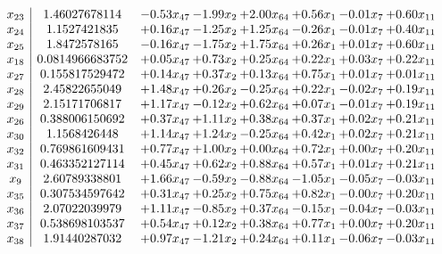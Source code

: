 \documentclass[8pt]{article}
\begin{document}
\[\begin{array}{c| c c@{\hskip 2pt} c@{\hskip 2pt} c@{\hskip 2pt} c@{\hskip 2pt} c@{\hskip 2pt} c@{\hskip 2pt} }
 x_{23}   &  1.46027678114 & -0.53 x_{47} & -1.99 x_{2} & +  2.00 x_{64} & +  0.56 x_{1} & -0.01 x_{7} & +  0.60 x_{11}\\
 x_{24}   &  1.1527421835 & +  0.16 x_{47} & -1.25 x_{2} & +  1.25 x_{64} & -0.26 x_{1} & -0.01 x_{7} & +  0.40 x_{11}\\
 x_{25}   &  1.8472578165 & -0.16 x_{47} & -1.75 x_{2} & +  1.75 x_{64} & +  0.26 x_{1} & +  0.01 x_{7} & +  0.60 x_{11}\\
 x_{18}   &  0.0814966683752 & +  0.05 x_{47} & +  0.73 x_{2} & +  0.25 x_{64} & +  0.22 x_{1} & +  0.03 x_{7} & +  0.22 x_{11}\\
 x_{27}   &  0.155817529472 & +  0.14 x_{47} & +  0.37 x_{2} & +  0.13 x_{64} & +  0.75 x_{1} & +  0.01 x_{7} & +  0.01 x_{11}\\
 x_{28}   &  2.45822655049 & +  1.48 x_{47} & +  0.26 x_{2} & -0.25 x_{64} & +  0.22 x_{1} & -0.02 x_{7} & +  0.19 x_{11}\\
 x_{29}   &  2.15171706817 & +  1.17 x_{47} & -0.12 x_{2} & +  0.62 x_{64} & +  0.07 x_{1} & -0.01 x_{7} & +  0.19 x_{11}\\
 x_{26}   &  0.388006150692 & +  0.37 x_{47} & +  1.11 x_{2} & +  0.38 x_{64} & +  0.37 x_{1} & +  0.02 x_{7} & +  0.21 x_{11}\\
 x_{30}   &  1.1568426448 & +  1.14 x_{47} & +  1.24 x_{2} & -0.25 x_{64} & +  0.42 x_{1} & +  0.02 x_{7} & +  0.21 x_{11}\\
 x_{32}   &  0.769861609431 & +  0.77 x_{47} & +  1.00 x_{2} & +  0.00 x_{64} & +  0.72 x_{1} & +  0.00 x_{7} & +  0.20 x_{11}\\
 x_{31}   &  0.463352127114 & +  0.45 x_{47} & +  0.62 x_{2} & +  0.88 x_{64} & +  0.57 x_{1} & +  0.01 x_{7} & +  0.21 x_{11}\\
 x_{9}   &  2.60789338801 & +  1.66 x_{47} & -0.59 x_{2} & -0.88 x_{64} & -1.05 x_{1} & -0.05 x_{7} & -0.03 x_{11}\\
 x_{35}   &  0.307534597642 & +  0.31 x_{47} & +  0.25 x_{2} & +  0.75 x_{64} & +  0.82 x_{1} & -0.00 x_{7} & +  0.20 x_{11}\\
 x_{36}   &  2.07022039979 & +  1.11 x_{47} & -0.85 x_{2} & +  0.37 x_{64} & -0.15 x_{1} & -0.04 x_{7} & -0.03 x_{11}\\
 x_{37}   &  0.538698103537 & +  0.54 x_{47} & +  0.12 x_{2} & +  0.38 x_{64} & +  0.77 x_{1} & +  0.00 x_{7} & +  0.20 x_{11}\\
 x_{38}   &  1.91440287032 & +  0.97 x_{47} & -1.21 x_{2} & +  0.24 x_{64} & +  0.11 x_{1} & -0.06 x_{7} & -0.03 x_{11}\\

\end{array}\]
\end{document}
